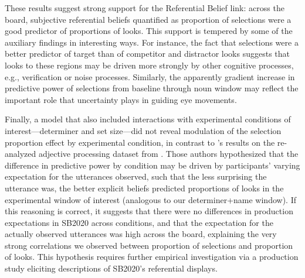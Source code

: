 \documentclass[10pt,letterpaper]{article}
\newcommand{\figref}[1]{Figure~\ref{#1}}
\newcommand{\expref}[1]{Exp.~#1}
\begin{document}


These results suggest strong support for the Referential Belief link: across the board, subjective referential beliefs quantified as proportion of selections were a good predictor of proportions of looks. This support is tempered by some of the auxiliary findings in interesting ways. For instance, the fact that selections were a better predictor of target than of competitor and distractor looks suggests that looks to these regions may be driven more strongly by other cognitive processes, e.g.,  verification or noise processes. Similarly, the apparently gradient increase in predictive power of selections from baseline through noun window may reflect the important role that uncertainty plays in guiding eye movements.

Finally, a model that also included interactions with experimental conditions of interest---determiner and set size---did not reveal modulation of the selection proportion effect by experimental condition, in contrast to 's results on the re-analyzed adjective processing dataset from . Those authors hypothesized that the difference in predictive power by condition may be driven by participants' varying expectation for the utterances observed, such that the less surprising the utterance was, the better explicit beliefs predicted proportions of looks in the experimental window of interest (analogous to our determiner+name window). If this reasoning is correct, it suggests that there were no differences in production expectations in SB2020 across conditions, and that the expectation for the actually observed utterances was high across the board, explaining the very strong correlations we observed between proportion of selections and proportion of looks. This hypothesis requires further empirical investigation via a production study eliciting descriptions of SB2020's referential displays.
\end{document}
